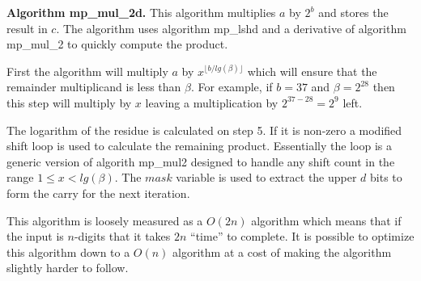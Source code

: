 \documentclass[b5paper]{book}
\begin{document}
\textbf{Algorithm mp\_mul\_2d.}
This algorithm multiplies $a$ by $2^b$ and stores the result in $c$.  The algorithm uses algorithm mp\_lshd and a derivative of algorithm mp\_mul\_2 to
quickly compute the product.

First the algorithm will multiply $a$ by $x^{\lfloor b / lg(\beta) \rfloor}$ which will ensure that the remainder multiplicand is less than 
$\beta$.  For example, if $b = 37$ and $\beta = 2^{28}$ then this step will multiply by $x$ leaving a multiplication by $2^{37 - 28} = 2^{9}$ 
left.

The logarithm of the residue is calculated on step 5.  If it is non-zero a modified shift loop is used to calculate the remaining product.  
Essentially the loop is a generic version of algorith mp\_mul2 designed to handle any shift count in the range $1 \le x < lg(\beta)$.  The $mask$
variable is used to extract the upper $d$ bits to form the carry for the next iteration.  

This algorithm is loosely measured as a $O(2n)$ algorithm which means that if the input is $n$-digits that it takes $2n$ ``time'' to 
complete.  It is possible to optimize this algorithm down to a $O(n)$ algorithm at a cost of making the algorithm slightly harder to follow.
\end{document}
